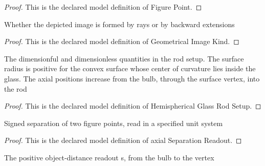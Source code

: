 \begin{proof}
  This is the declared model definition of Figure Point.
\end{proof}
\begin{definition}
  \label{def:physics:phyx-mini-0054:phyxminiproblems-problemphyxmini0054-geometricalimagekind}
  Whether the depicted image is formed by rays or by backward extensions
\end{definition}
\begin{proof}
  This is the declared model definition of Geometrical Image Kind.
\end{proof}
\begin{definition}
  \label{def:physics:phyx-mini-0054:phyxminiproblems-problemphyxmini0054-hemisphericalglassrodsetup}
  The dimensionful and dimensionless quantities in the rod setup. The surface radius is positive for the convex surface whose center of curvature lies inside the glass. The axial positions increase from the bulb, through the surface vertex, into the rod
\end{definition}
\begin{proof}
  This is the declared model definition of Hemispherical Glass Rod Setup.
\end{proof}
\begin{definition}
  \label{def:physics:phyx-mini-0054:phyxminiproblems-problemphyxmini0054-axialseparationreadout}
  Signed separation of two figure points, read in a specified unit system
\end{definition}
\begin{proof}
  This is the declared model definition of axial Separation Readout.
\end{proof}
\begin{definition}
  \label{def:physics:phyx-mini-0054:phyxminiproblems-problemphyxmini0054-objectdistancereadout}
  The positive object-distance readout s, from the bulb to the vertex
\end{definition}
